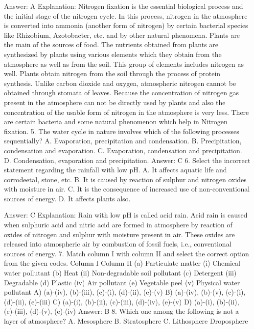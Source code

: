 Answer: A
Explanation: Nitrogen fixation is the essential biological process and the initial stage of the nitrogen cycle. In this process, nitrogen in the atmosphere is converted into ammonia (another form of nitrogen) by certain bacterial species like Rhizobium, Azotobacter, etc. and by other natural phenomena. Plants are the main of the sources of food. The nutrients obtained from plants are synthesized by plants using various elements which they obtain from the atmosphere as well as from the soil. This group of elements includes nitrogen as well. Plants obtain nitrogen from the soil through the process of protein synthesis. Unlike carbon dioxide and oxygen, atmospheric nitrogen cannot be obtained through stomata of leaves. Because the concentration of nitrogen gas present in the atmosphere can not be directly used by plants and also the concentration of the usable form of nitrogen in the atmosphere is very less. There are certain bacteria and some natural phenomenon which help in Nitrogen fixation. 5. The water cycle in nature involves which of the following processes sequentially? A. Evaporation, precipitation and condensation. B. Precipitation, condensation and evaporation. C. Evaporation, condensation and precipitation. D. Condensation, evaporation and precipitation. 
Answer: C 6. Select the incorrect statement regarding the rainfall with low pH. A. It affects aquatic life 
and corrodeetal, stone, etc. B. It is caused by reaction of sulphur and nitrogen oxides with moisture in air. C. It is the consequence of increased use of non-conventional sources of energy. D. It affects plants also. 

Answer: C
Explanation: Rain with low pH is called acid rain. Acid rain is caused when sulphuric acid and nitric acid are formed in atmosphere by reaction of oxides of nitrogen and sulphur with moisture present in air. These oxides are released into atmospheric air by combustion of fossil fuels, i.e., conventional sources of energy. 7. Match column I with column II and select the correct option from the given codes. Column I Column II (a) Particulate matter (i) Chemical water pollutant (b) Heat (ii) Non-degradable soil pollutant (c) Detergent (iii) Degradable (d) Plastic (iv) Air pollutant (e) Vegetable peel (v) Physical water pollutant A) (a)-(iv), (b)-(iii), (c)-(i), (d)-(ii), (e)-(v) B) (a)-(iv), (b)-(v), (c)-(i), (d)-(ii), (e)-(iii) C) (a)-(i), (b)-(ii), (c)-(iii), (d)-(iv), (e)-(v) D) (a)-(i), (b)-(ii), (c)-(iii), (d)-(v), (e)-(iv) 
Answer: B 8. Which one among the following is not a layer of atmosphere? A. Mesosphere B. Stratosphere C. 
Lithosphere Droposphere 

